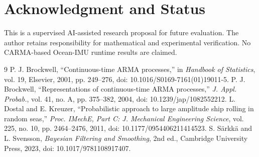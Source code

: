 \documentclass[10pt,journal]{IEEEtran}
\begin{document}
\section*{Acknowledgment and Status}
This is a supervised AI-assisted research proposal
for future evaluation. The author retains responsibility
for mathematical and experimental verification.
No CARMA-based Ocean-IMU runtime results are claimed.

\begin{thebibliography}{9}
P. J. Brockwell, ``Continuous-time ARMA processes,''
in \emph{Handbook of Statistics}, vol. 19,
Elsevier, 2001, pp. 249--276,
doi: 10.1016/S0169-7161(01)19011-5.
P. J. Brockwell, ``Representations of continuous-time
ARMA processes,'' \emph{J. Appl. Probab.},
vol. 41, no. A, pp. 375--382, 2004,
doi: 10.1239/jap/1082552212.
L. Dostal and E. Kreuzer,
``Probabilistic approach to large amplitude ship rolling in
random seas,'' \emph{Proc. IMechE, Part C: J. Mechanical
Engineering Science}, vol. 225, no. 10,
pp. 2464--2476, 2011,
doi: 10.1177/0954406211414523.
S. S\"arkk\"a and L. Svensson,
\emph{Bayesian Filtering and Smoothing}, 2nd ed.,
Cambridge University Press, 2023,
doi: 10.1017/9781108917407.
\end{thebibliography}
\end{document}

